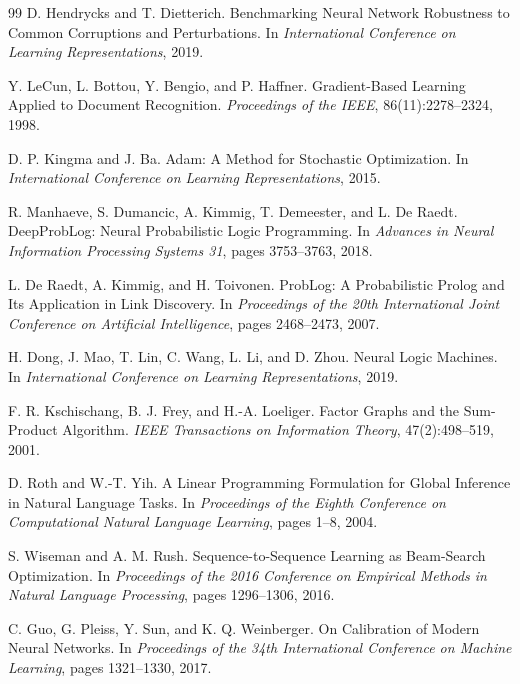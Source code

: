 \documentclass[12pt]{article}
\begin{document}
\begin{thebibliography}{99}
D. Hendrycks and T. Dietterich.
\newblock Benchmarking Neural Network Robustness to Common Corruptions and Perturbations.
\newblock In \textit{International Conference on Learning Representations}, 2019.

Y. LeCun, L. Bottou, Y. Bengio, and P. Haffner.
\newblock Gradient-Based Learning Applied to Document Recognition.
\newblock \textit{Proceedings of the IEEE}, 86(11):2278--2324, 1998.

D. P. Kingma and J. Ba.
\newblock Adam: A Method for Stochastic Optimization.
\newblock In \textit{International Conference on Learning Representations}, 2015.

R. Manhaeve, S. Dumancic, A. Kimmig, T. Demeester, and L. De Raedt.
\newblock DeepProbLog: Neural Probabilistic Logic Programming.
\newblock In \textit{Advances in Neural Information Processing Systems 31}, pages 3753--3763, 2018.

L. De Raedt, A. Kimmig, and H. Toivonen.
\newblock ProbLog: A Probabilistic Prolog and Its Application in Link Discovery.
\newblock In \textit{Proceedings of the 20th International Joint Conference on Artificial Intelligence}, pages 2468--2473, 2007.

H. Dong, J. Mao, T. Lin, C. Wang, L. Li, and D. Zhou.
\newblock Neural Logic Machines.
\newblock In \textit{International Conference on Learning Representations}, 2019.

F. R. Kschischang, B. J. Frey, and H.-A. Loeliger.
\newblock Factor Graphs and the Sum-Product Algorithm.
\newblock \textit{IEEE Transactions on Information Theory}, 47(2):498--519, 2001.

D. Roth and W.-T. Yih.
\newblock A Linear Programming Formulation for Global Inference in Natural Language Tasks.
\newblock In \textit{Proceedings of the Eighth Conference on Computational Natural Language Learning}, pages 1--8, 2004.

S. Wiseman and A. M. Rush.
\newblock Sequence-to-Sequence Learning as Beam-Search Optimization.
\newblock In \textit{Proceedings of the 2016 Conference on Empirical Methods in Natural Language Processing}, pages 1296--1306, 2016.

C. Guo, G. Pleiss, Y. Sun, and K. Q. Weinberger.
\newblock On Calibration of Modern Neural Networks.
\newblock In \textit{Proceedings of the 34th International Conference on Machine Learning}, pages 1321--1330, 2017.

\end{thebibliography}
\end{document}
